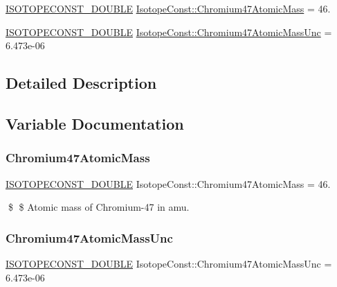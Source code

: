 \begin{DoxyCompactItemize}
\item 
\mbox{\hyperlink{group___isotope_const-_macros_ga8f45a7272ce02c0b4c65c44636ed719a}{I\+S\+O\+T\+O\+P\+E\+C\+O\+N\+S\+T\+\_\+\+D\+O\+U\+B\+LE}} \mbox{\hyperlink{group___isotope_const-_chromium-_cr47_ga42258150039100a5658222a2cf4fdae4}{Isotope\+Const\+::\+Chromium47\+Atomic\+Mass}} = 46.
\item 
\mbox{\hyperlink{group___isotope_const-_macros_ga8f45a7272ce02c0b4c65c44636ed719a}{I\+S\+O\+T\+O\+P\+E\+C\+O\+N\+S\+T\+\_\+\+D\+O\+U\+B\+LE}} \mbox{\hyperlink{group___isotope_const-_chromium-_cr47_gae7e34f3609088b9fd821f9191be46272}{Isotope\+Const\+::\+Chromium47\+Atomic\+Mass\+Unc}} = 6.\+473e-\/06
\end{DoxyCompactItemize}


\subsection{Detailed Description}


\subsection{Variable Documentation}
\mbox{\label{group___isotope_const-_chromium-_cr47_ga42258150039100a5658222a2cf4fdae4}} 
\subsubsection{\texorpdfstring{Chromium47\+Atomic\+Mass}{Chromium47AtomicMass}}
{\footnotesize\ttfamily \mbox{\hyperlink{group___isotope_const-_macros_ga8f45a7272ce02c0b4c65c44636ed719a}{I\+S\+O\+T\+O\+P\+E\+C\+O\+N\+S\+T\+\_\+\+D\+O\+U\+B\+LE}} Isotope\+Const\+::\+Chromium47\+Atomic\+Mass = 46.}

\$ \$ Atomic mass of Chromium-\/47 in amu. \mbox{\label{group___isotope_const-_chromium-_cr47_gae7e34f3609088b9fd821f9191be46272}} 
\subsubsection{\texorpdfstring{Chromium47\+Atomic\+Mass\+Unc}{Chromium47AtomicMassUnc}}
{\footnotesize\ttfamily \mbox{\hyperlink{group___isotope_const-_macros_ga8f45a7272ce02c0b4c65c44636ed719a}{I\+S\+O\+T\+O\+P\+E\+C\+O\+N\+S\+T\+\_\+\+D\+O\+U\+B\+LE}} Isotope\+Const\+::\+Chromium47\+Atomic\+Mass\+Unc = 6.\+473e-\/06}


